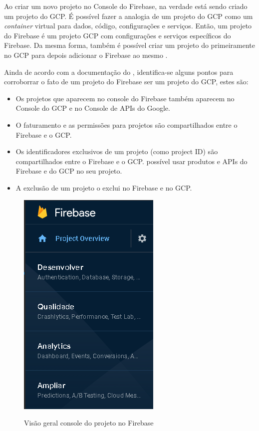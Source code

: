 Ao criar um novo projeto no Console do Firebase, na verdade está sendo criado um projeto do GCP. É possível fazer a analogia de  um projeto do GCP como um \textit{container} virtual para dados, código, configurações e serviços. Então, um projeto do Firebase é um projeto GCP com configurações e serviços específicos do Firebase. Da mesma forma, também é possível criar um projeto do primeiramente no GCP para depois adicionar o Firebase ao mesmo \citep{firebase_docs}.

Ainda de acordo com a documentação do \citeauthor{firebase_docs}, identifica-se alguns pontos para corroborrar o fato de um projeto do Firebase ser um projeto do GCP, estes são:

\begin{itemize}
    \item Os projetos que aparecem no console do Firebase também aparecem no Console do GCP e no Console de APIs do Google.
    \item O faturamento e as permissões para projetos são compartilhados entre o Firebase e o GCP.
    \item Os identificadores exclusivos de um projeto (como project ID) são compartilhados entre o Firebase e o GCP.
     possível usar produtos e APIs do Firebase e do GCP no seu projeto.
    \item A exclusão de um projeto o exclui no Firebase e no GCP.
\end{itemize}

\begin{figure}[htb]
     \caption{Visão geral console do projeto no Firebase}
     \centering
     \includegraphics {img/firebase_console.PNG}
     \label{fig:firebase_console}
 \end{figure}
	
